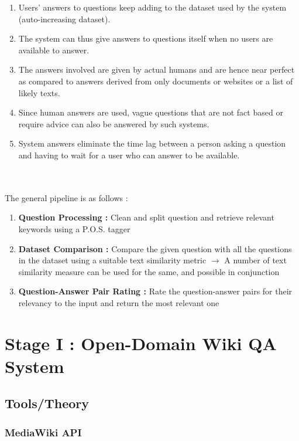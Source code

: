 \documentclass[12pt, a4paper]{article}
\begin{document}
\begin{enumerate}
    \item Users' answers to questions keep adding to the dataset used by the system (auto-increasing dataset). 
    \item The system can thus give answers to questions itself when no users are available to answer. 
    \item The answers involved are given by actual humans and are hence near perfect as compared to answers derived from only documents or websites or a list of likely texts. 
    \item Since human answers are used, vague questions that are not fact based or require advice can also be answered by such systems. 
    \item System answers eliminate the time lag between a person asking a question and having to wait for a user who can answer to be available. 
\end{enumerate} 
\\~\\ 
The general pipeline is as follows : 

\begin{enumerate}
    \item \textbf{Question Processing :} Clean and split question and retrieve relevant keywords using a P.O.S. tagger 
    \item \textbf{Dataset Comparison :} Compare the given question with all the questions in the dataset using a suitable text similarity metric 
    \(\rightarrow\) A number of text similarity measure can be used for the same, and possible in conjunction
    \item \textbf{Question-Answer Pair Rating : } Rate the question-answer pairs for their relevancy to the input and return the most relevant one 
\end{enumerate}

\newpage 
\section{Stage I : Open-Domain Wiki QA System} 

\subsection{Tools/Theory} 
\subsubsection{MediaWiki API} 
\end{document}
